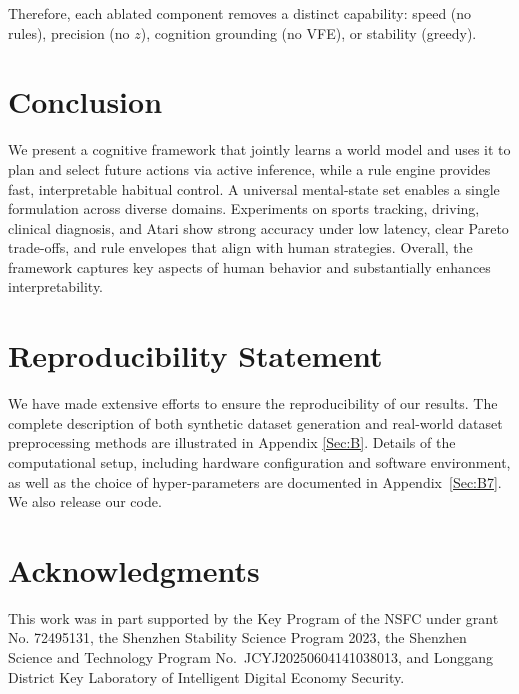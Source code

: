 \documentclass{article} %
\begin{document}
Therefore, each ablated component removes a distinct capability: speed (no rules), precision (no $z$), cognition grounding (no VFE), or stability (greedy).

\section{Conclusion}
\label{sec:conclusion}
\vspace{-5pt}
We present a cognitive framework that jointly learns a world model and uses it to plan and select future actions via active inference, while a rule engine provides fast, interpretable habitual control. A universal mental-state set enables a single formulation across diverse domains. Experiments on sports tracking, driving, clinical diagnosis, and Atari show strong accuracy under low latency, clear Pareto trade-offs, and rule envelopes that align with human strategies. Overall, the framework captures key aspects of human behavior and substantially enhances interpretability.

\clearpage

\section*{Reproducibility Statement} We have made extensive efforts to ensure the reproducibility of our results. The complete description of both synthetic dataset generation and real-world dataset preprocessing methods are illustrated in Appendix \ref{Sec:B}. Details of the computational setup, including hardware configuration and software environment, as well as the choice of hyper-parameters are documented in Appendix~\ref{Sec:B7}. We also release our code.
 
\section*{Acknowledgments}
This work was in part supported by the Key Program of the NSFC under grant No. 72495131, the Shenzhen Stability Science Program 2023, the Shenzhen Science and Technology Program No.~JCYJ20250604141038013, and Longgang District Key Laboratory of Intelligent Digital Economy Security.





\newpage
\appendix
\end{document}
